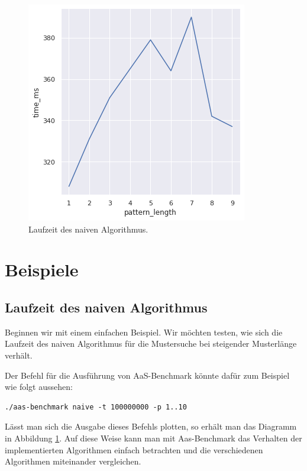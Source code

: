 \documentclass[twocolumn]{article}
\begin{document}
\begin{figure}[h]
    \centering
    \includegraphics[width=0.85\linewidth]{assets/graph_1.png}
    \caption{Laufzeit des naiven Algorithmus.}
    \label{fig:runtime_naive}
\end{figure}

\section{Beispiele}

\subsection*{Laufzeit des naiven Algorithmus}

Beginnen wir mit einem einfachen Beispiel. Wir möchten testen, wie sich die Laufzeit des naiven Algorithmus für die Mustersuche bei steigender Musterlänge verhält.

Der Befehl für die Ausführung von AaS-Benchmark könnte dafür zum Beispiel wie folgt aussehen:

\begin{lstlisting}[breaklines=true,autogobble=true]
    ./aas-benchmark naive -t 100000000 -p 1..10
\end{lstlisting}

Lässt man sich die Ausgabe dieses Befehls plotten, so erhält man das Diagramm in Abbildung \ref{fig:runtime_naive}. Auf diese Weise kann man mit Aas-Benchmark das Verhalten der implementierten Algorithmen einfach betrachten und die verschiedenen Algorithmen miteinander vergleichen.
\end{document}
